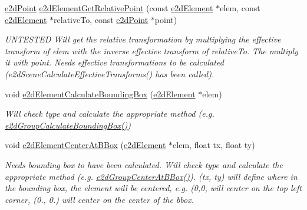 \begin{DoxyCompactItemize}
\hyperlink{structe2d_point}{e2d\-Point} \hyperlink{group__e2d_element_gac3ad9f8cdc0782378c9f2e93cb7da68f}{e2d\-Element\-Get\-Relative\-Point} (const \hyperlink{structe2d_element}{e2d\-Element} $\ast$elem, const \hyperlink{structe2d_element}{e2d\-Element} $\ast$relative\-To, const \hyperlink{structe2d_point}{e2d\-Point} $\ast$point)
\begin{DoxyCompactList}\small\item\em U\-N\-T\-E\-S\-T\-E\-D Will get the relative transformation by multiplying the effective transform of elem with the inverse effective transform of relative\-To. The multiply it with point. Needs effective transformations to be calculated (e2d\-Scene\-Calculate\-Effective\-Transforms() has been called). \end{DoxyCompactList}\item 
void \hyperlink{group__e2d_element_ga94aa710b2da71af2091fe4d5b87ce47e}{e2d\-Element\-Calculate\-Bounding\-Box} (\hyperlink{structe2d_element}{e2d\-Element} $\ast$elem)
\begin{DoxyCompactList}\small\item\em Will check type and calculate the appropriate method (e.\-g. \hyperlink{group__e2d_group_ga7c5f43489bbd2d36a51414aee07abf5a}{e2d\-Group\-Calculate\-Bounding\-Box()}) \end{DoxyCompactList}\item 
void \hyperlink{group__e2d_element_ga36b01a888c97163c990e16d348aff61c}{e2d\-Element\-Center\-At\-B\-Box} (\hyperlink{structe2d_element}{e2d\-Element} $\ast$elem, float tx, float ty)
\begin{DoxyCompactList}\small\item\em Needs bounding box to have been calculated. Will check type and calculate the appropriate method (e.\-g. \hyperlink{group__e2d_group_ga04bf94419865ca7f9d6daf30ce3fadf0}{e2d\-Group\-Center\-At\-B\-Box()}). (tx, ty) will define where in the bounding box, the element will be centered, e.\-g. (0,0, will center on the top left corner, (0., 0.) will center on the center of the bbox. \end{DoxyCompactList}\end{DoxyCompactItemize}


